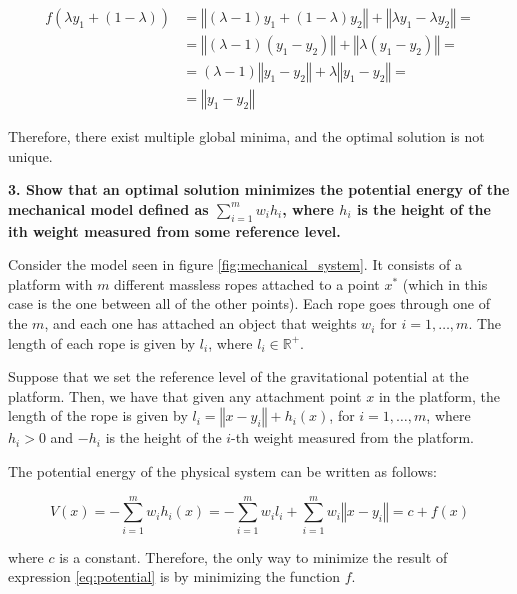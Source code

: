 \documentclass[11pt,a4paper]{article}
\begin{document}
\begin{equation*}
\begin{aligned}
  f(\lambda y_1 + (1 - \lambda)) &= \left\Vert (\lambda - 1) y_1 + (1 - \lambda) y_2 \right\Vert
  + \left\Vert \lambda y_1 - \lambda y_2 \right\Vert = \\
  &= \left\Vert (\lambda - 1) (y_1 - y_2) \right\Vert + \left\Vert \lambda (y_1 - y_2) \right\Vert = \\
  &= (\lambda - 1) \left\Vert y_1 - y_2 \right\Vert + \lambda \left\Vert y_1 - y_2 \right\Vert = \\
  &= \left\Vert y_1 - y_2 \right\Vert
\end{aligned}
\end{equation*}

Therefore, there exist multiple global minima, and the optimal solution is not unique.

\noindent \textbf{3. Show that an optimal solution minimizes the potential energy of the
mechanical model defined as $\sum_{i=1}^m w_i h_i$, where $h_i$ is the height of the ith
weight measured from some reference level.}

Consider the model seen in figure \ref{fig:mechanical_system}. It consists of a platform
with $m$ different massless ropes attached to a point $x^*$ (which in this case is the one
between all of the other points). Each rope goes through one of the $m$, and each
one has attached an object that weights $w_i$ for $i = 1, \dots, m$. The length of
each rope is given by $l_i$, where $l_i \in \mathbb{R}^+$.

Suppose that we set the reference level of the gravitational potential at the platform.
Then, we have that given any attachment point $x$ in the platform, the length of the rope
is given by $l_i = \left\Vert x - y_i \right\Vert + h_i(x)$, for $i = 1, \dots, m$,
where $h_i > 0$ and $-h_i$ is the height of the $i$-th weight measured from the platform.

The potential energy of the physical system can be written as follows:

\begin{equation}
  \label{eq:potential}
  V(x) = - \sum_{i=1}^m w_i h_i (x) = - \sum_{i=1}^m w_i l_i + \sum_{i=1}^m w_i \left\Vert x - y_i \right\Vert = c + f(x)
\end{equation}

\noindent where $c$ is a constant. Therefore, the only way to minimize the result of expression
\eqref{eq:potential} is by minimizing the function $f$.
\end{document}
